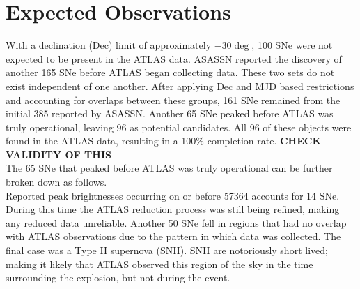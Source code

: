 \section{Expected Observations}\label{sec:expobs}

\indent With a declination (Dec) limit of approximately $-30\deg$, 100 SNe were not 
expected to be present in the ATLAS data.
ASASSN reported the discovery of another 165 SNe before ATLAS began collecting data. 
These two sets do not exist independent of one another. 
After applying Dec and MJD based restrictions and accounting for overlaps between 
these groups, 161 SNe remained from the initial 385 reported by ASASSN. 
Another 65 SNe peaked before ATLAS was truly operational, leaving 96 as potential candidates.
All 96 of these objects were found in the ATLAS data, resulting in a 100\% completion rate.
{\bf CHECK VALIDITY OF THIS}\\
\indent The 65 SNe that peaked before ATLAS was truly operational can be further broken down as follows.\\
Reported peak brightnesses occurring on or before 57364 accounts for 14 SNe. 
During this time the ATLAS reduction process was still being refined, making 
any reduced data unreliable.
Another 50 SNe fell in regions that had no overlap with ATLAS observations due 
to the pattern in which data was collected.
The final case was a Type II supernova (SNII).
SNII are notoriously short lived; making it likely that ATLAS observed this region of the sky in the 
time surrounding the explosion, but not during the event.




